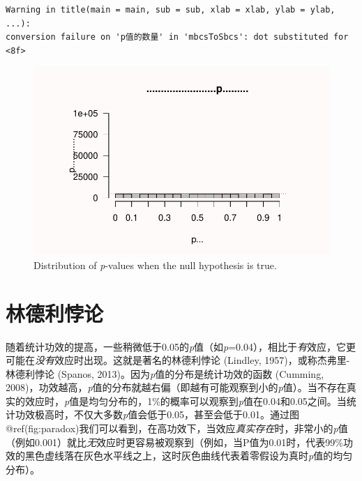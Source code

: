 \documentclass[
  letterpaper,
  DIV=11,
  numbers=noendperiod]{scrreprt}
\begin{document}
\begin{verbatim}
Warning in title(main = main, sub = sub, xlab = xlab, ylab = ylab, ...):
conversion failure on 'p值的数量' in 'mbcsToSbcs': dot substituted for <8f>
\end{verbatim}

\begin{figure}

{\centering \includegraphics[width=1\textwidth,height=\textheight]{01-pvalue_files/figure-pdf/fig-pdistr2-1.pdf}

}

\caption{\label{fig-pdistr2}Distribution of \emph{p}-values when the
null hypothesis is true.}

\end{figure}

\hypertarget{sec-lindley}{%
\section{林德利悖论}\label{sec-lindley}}

随着统计功效的提高，一些稍微低于0.05的\emph{p}值（如\emph{p}=0.04），相比于\emph{有}效应，它更可能在\emph{没有}效应时出现。这就是著名的林德利悖论
(Lindley, 1957)，或称杰弗里-林德利悖论 (Spanos,
2013)。因为\emph{p}值的分布是统计功效的函数 (Cumming,
2008)，功效越高，\emph{p}值的分布就越右偏（即越有可能观察到小的\emph{p}值）。当不存在真实的效应时，\emph{p}值是均匀分布的，1\%的概率可以观察到\emph{p}值在0.04和0.05之间。当统计功效极高时，不仅大多数\emph{p}值会低于0.05，甚至会低于0.01。通过图@ref(fig:paradox)我们可以看到，在高功效下，当效应\emph{真实存在}时，非常小的\emph{p}值（例如0.001）就比\emph{无}效应时更容易被观察到（例如，当P值为0.01时，代表99\%功效的黑色虚线落在灰色水平线之上，这时灰色曲线代表着零假设为真时\emph{p}值的均匀分布）。
\end{document}
